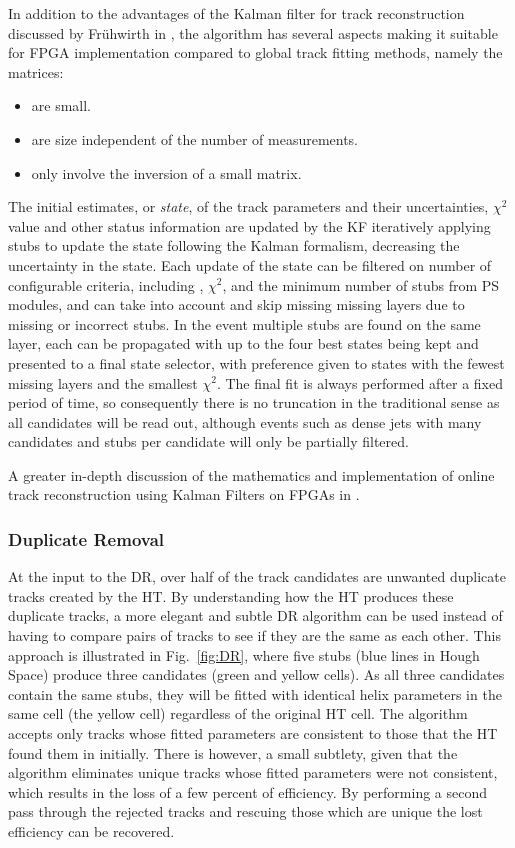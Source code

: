 In addition to the advantages of the Kalman filter for track reconstruction discussed by Fr{\"u}hwirth in \cite{Fruhwirth:1987fm}, the algorithm has several aspects making it suitable for FPGA implementation compared to global track fitting methods, namely the matrices:

\begin{itemize}
\item {are small.}
\item {are size independent of the number of measurements.}
\item {only involve the inversion of a small matrix.}
\end{itemize}

The initial estimates, or \textit{state}, of the track parameters and their uncertainties, $\chi^2$ value and other status information are updated by the KF iteratively applying stubs to update the state following the Kalman formalism, decreasing the uncertainty in the state. 
Each update of the state can be filtered on number of configurable criteria, including \pT, $\chi^2$, and the minimum number of stubs from PS modules, and can take into account and skip missing missing layers due to missing or incorrect stubs.
In the event multiple stubs are found on the same layer, each can be propagated with up to the four best states being kept and presented to a final state selector, with preference given to states with the fewest missing layers and the smallest $\chi^2$.
The final fit is always performed after a fixed period of time, so consequently there is no truncation in the traditional sense as all candidates will be read out, although events such as dense jets with many candidates and stubs per candidate will only be partially filtered.

A greater in-depth discussion of the mathematics and implementation of online track reconstruction using Kalman Filters on FPGAs in \cite{SSummers}.

\subsubsection{Duplicate Removal}
At the input to the DR, over half of the track candidates are unwanted duplicate tracks created by the HT.
By understanding how the HT produces these duplicate tracks, a more elegant and subtle DR algorithm can be used instead of having to compare pairs of tracks to see if they are the same as each other.
This approach is illustrated in Fig.~\ref{fig:DR}, where five stubs (blue lines in Hough Space) produce three candidates (green and yellow cells).
As all three candidates contain the same stubs, they will be fitted with identical helix parameters in the same cell (the yellow cell) regardless of the original HT cell.
The algorithm accepts only tracks whose fitted parameters are consistent to those that the HT found them in initially. There is however, a small subtlety, given that the algorithm eliminates unique tracks whose fitted parameters were not consistent, which results in the loss of a few percent of efficiency. 
By performing a second pass through the rejected tracks and rescuing those which are unique the lost efficiency can be recovered.

